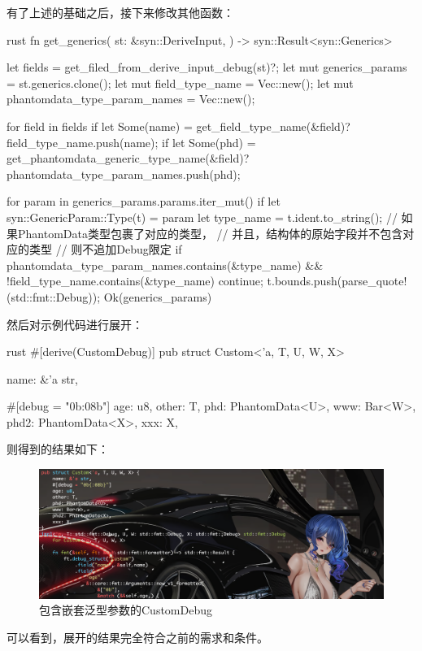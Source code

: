 有了上述的基础之后，接下来修改其他函数：
\begin{code-block}{rust}
fn get_generics(
    st: &syn::DeriveInput,
) -> syn::Result<syn::Generics> {
    let fields = get_filed_from_derive_input_debug(st)?;
    let mut generics_params = st.generics.clone();
    let mut field_type_name = Vec::new();
    let mut phantomdata_type_param_names = Vec::new();

    for field in fields {
        if let Some(name) = get_field_type_name(&field)? {
            field_type_name.push(name);
        }
        if let Some(phd) = get_phantomdata_generic_type_name(&field)? {
            phantomdata_type_param_names.push(phd);
        }
    }

    for param in generics_params.params.iter_mut() {
        if let syn::GenericParam::Type(t) = param {
            let type_name = t.ident.to_string();
            // 如果PhantomData类型包裹了对应的类型，
            // 并且，结构体的原始字段并不包含对应的类型
            // 则不追加Debug限定
            if phantomdata_type_param_names.contains(&type_name)
                && !field_type_name.contains(&type_name)
            {
                continue;
            }
            t.bounds.push(parse_quote!(std::fmt::Debug));
        }
    }
    Ok(generics_params)
}
\end{code-block}

然后对示例代码进行展开：
\begin{code-block}{rust}
#[derive(CustomDebug)]
pub struct Custom<'a, T, U, W, X> {
    name: &'a str,

    #[debug = "0b{:08b}"]
    age: u8,
    other: T,
    phd: PhantomData<U>,
    www: Bar<W>,
    phd2: PhantomData<X>,
    xxx: X,
}
\end{code-block}
则得到的结果如下：
\begin{figure}[H]
  \centering
  \includegraphics[width=\linewidth]{rust_with_generic_and_phantomdata.png}
  \caption{包含嵌套泛型参数的CustomDebug}
  \label{fig:rust_with_generic_and_phantomdata}
\end{figure}
可以看到，展开的结果完全符合之前的需求和条件。

